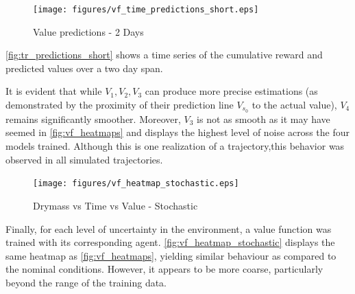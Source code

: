 \begin{figure}[H]
	\centering
	\texttt{[image: figures/vf\_time\_predictions\_short.eps]}
	\caption{Value predictions - 2 Days}
	\label{fig:tr_predictions_short}
\end{figure}

	


\autoref{fig:tr_predictions_short} shows a time series of the cumulative reward and predicted values over a two day span. 

\begin{remark}\label{rem:vf-smoothness}
	It is evident that while $V_1, V_2, V_3$ can produce more precise estimations (as demonstrated by the proximity of their prediction line $V_{s_0}$ to the actual value), $V_4$ remains significantly smoother. Moreover, $V_3$ is not as smooth as it may have seemed in \autoref{fig:vf_heatmaps} and displays the highest level of noise across the four models trained. Although this is one realization of a trajectory,this behavior was observed in all simulated trajectories.
\end{remark}



\begin{figure}[H]
	\centering
	\texttt{[image: figures/vf\_heatmap\_stochastic.eps]}
	\caption{Drymass vs Time vs Value - Stochastic}
	\label{fig:vf_heatmap_stochastic}
\end{figure}
Finally, for each level of uncertainty in the environment, a value function was trained with its corresponding agent. \autoref{fig:vf_heatmap_stochastic} displays the same heatmap as \autoref{fig:vf_heatmaps}, yielding similar behaviour as compared to the nominal conditions. However, it appears to be more coarse, particularly beyond the range of the training data.


